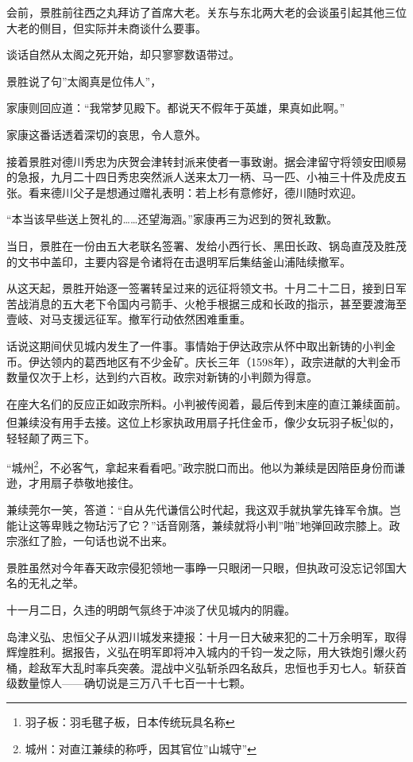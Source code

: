\documentclass[
]{book}
\begin{document}
会前，景胜前往西之丸拜访了首席大老。关东与东北两大老的会谈虽引起其他三位大老的侧目，但实际并未商谈什么要事。

谈话自然从太阁之死开始，却只寥寥数语带过。

景胜说了句''太阁真是位伟人''，

家康则回应道：``我常梦见殿下。都说天不假年于英雄，果真如此啊。''

家康这番话透着深切的哀思，令人意外。

接着景胜对德川秀忠为庆贺会津转封派来使者一事致谢。据会津留守将领安田顺易的急报，九月二十四日秀忠突然派人送来太刀一柄、马一匹、小袖三十件及虎皮五张。看来德川父子是想通过赠礼表明：若上杉有意修好，德川随时欢迎。

``本当该早些送上贺礼的\ldots\ldots 还望海涵。''家康再三为迟到的贺礼致歉。

当日，景胜在一份由五大老联名签署、发给小西行长、黑田长政、锅岛直茂及胜茂的文书中盖印，主要内容是令诸将在击退明军后集结釜山浦陆续撤军。

从这天起，景胜开始逐一签署转呈过来的远征将领文书。十月二十二日，接到日军苦战消息的五大老下令国内弓箭手、火枪手根据三成和长政的指示，甚至要渡海至壹岐、对马支援远征军。撤军行动依然困难重重。

话说这期间伏见城内发生了一件事。事情始于伊达政宗从怀中取出新铸的小判金币。伊达领内的葛西地区有不少金矿。庆长三年（1598年），政宗进献的大判金币数量仅次于上杉，达到约六百枚。政宗对新铸的小判颇为得意。

在座大名们的反应正如政宗所料。小判被传阅着，最后传到末座的直江兼续面前。但兼续没有用手去接。这位上杉家执政用扇子托住金币，像少女玩羽子板\footnote{羽子板：羽毛毽子板，日本传统玩具名称}似的，轻轻颠了两三下。

``城州\footnote{城州：对直江兼续的称呼，因其官位''山城守''}，不必客气，拿起来看看吧。''政宗脱口而出。他以为兼续是因陪臣身份而谦逊，才用扇子恭敬地接住。

兼续莞尔一笑，答道：``自从先代谦信公时代起，我这双手就执掌先锋军令旗。岂能让这等卑贱之物玷污了它？''话音刚落，兼续就将小判''啪''地弹回政宗膝上。政宗涨红了脸，一句话也说不出来。

景胜虽然对今年春天政宗侵犯领地一事睁一只眼闭一只眼，但执政可没忘记邻国大名的无礼之举。

十一月二日，久违的明朗气氛终于冲淡了伏见城内的阴霾。

岛津义弘、忠恒父子从泗川城发来捷报：十月一日大破来犯的二十万余明军，取得辉煌胜利。据报告，义弘在明军即将冲入城内的千钧一发之际，用大铁炮引爆火药桶，趁敌军大乱时率兵突袭。混战中义弘斩杀四名敌兵，忠恒也手刃七人。斩获首级数量惊人------确切说是三万八千七百一十七颗。
\end{document}
